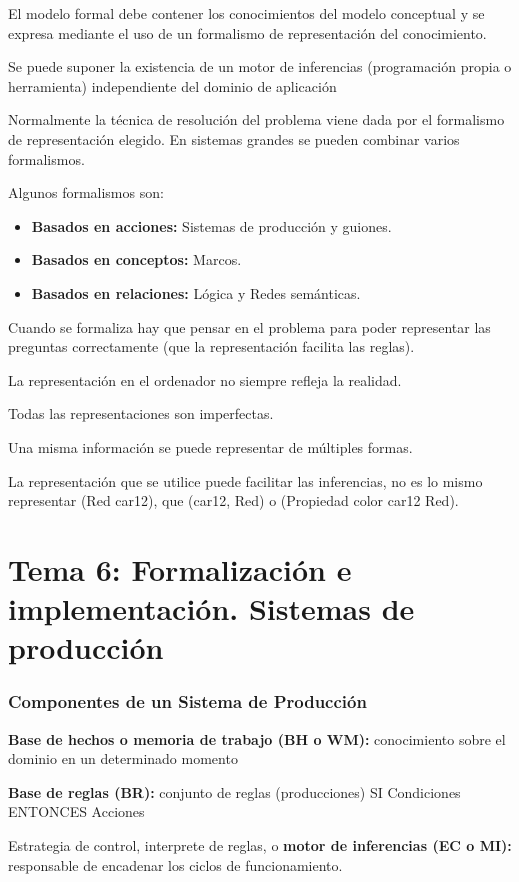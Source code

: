 \documentclass[12pt, twoside, openright]{report} %
\begin{document}
El modelo formal debe contener los conocimientos del modelo conceptual y se expresa mediante el uso de un formalismo de representación del conocimiento.

Se puede suponer la existencia de un motor de inferencias (programación propia o herramienta) independiente del dominio de aplicación

Normalmente la técnica de resolución del problema viene dada por el formalismo de representación elegido. En sistemas grandes se pueden combinar varios formalismos. 

Algunos formalismos son:
\begin{itemize}
	\item \textbf{Basados en acciones:} Sistemas de producción y guiones.
	\item \textbf{Basados en conceptos:} Marcos.
	\item \textbf{Basados en relaciones:} Lógica y Redes semánticas.
\end{itemize}

Cuando se formaliza hay que pensar en el problema para poder representar las preguntas correctamente (que la representación facilita las reglas).

La representación en el ordenador no siempre refleja la realidad. 

Todas las representaciones son imperfectas.

Una misma información se puede representar de múltiples formas.

La representación que se utilice puede facilitar las inferencias, no es lo mismo representar (Red car12), que (car12, Red) o (Propiedad color car12 Red).

\chapter{Tema 6: Formalización e implementación. Sistemas de producción}
\subsection{Componentes de un Sistema de Producción}
\textbf{Base de hechos o memoria de trabajo (BH o WM):} conocimiento sobre el dominio en un determinado momento

\textbf{Base de reglas (BR):} conjunto de reglas (producciones) SI Condiciones ENTONCES Acciones

Estrategia de control, interprete de reglas, o \textbf{motor de inferencias (EC o MI):} responsable de encadenar los ciclos de funcionamiento.
\end{document}
